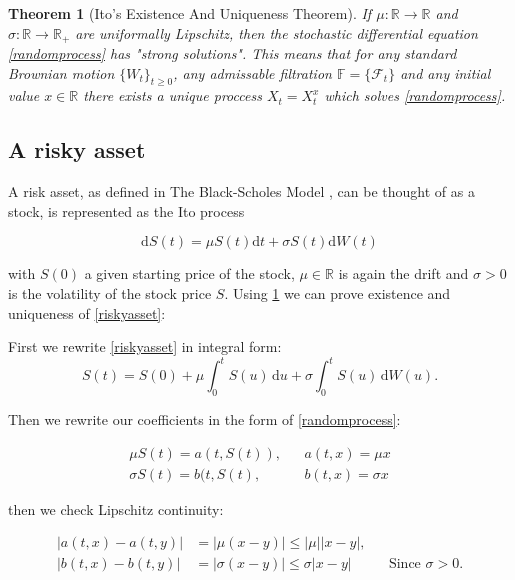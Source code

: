 \documentclass[11pt]{article} %
\newtheorem{theorem}{Theorem}[section]
\begin{document}
\begin{theorem}[Ito's Existence And Uniqueness Theorem] 
    \label{isosexistence}
    If $\mu : \mathbb{R} \to \mathbb{R}$ and $\sigma : \mathbb{R} \to \mathbb{R}_+$ 
    are uniformally Lipschitz, then the stochastic differential equation 
    \ref{randomprocess} has "strong solutions". This means that for any standard 
    Brownian motion $\{W_t\}_{t\geq0}$, any admissable filtration $\mathbb{F} = 
    \{\mathcal{F}_t\}$ and any initial value $x \in \mathbb{R}$ there exists a 
    unique proccess $X_t = X_t^x$ which solves \ref{randomprocess}.

    
\end{theorem}

\subsection{A risky asset}

A risk asset, as defined in The Black-Scholes Model \cite{blackscholes}, 
can be thought of as a stock, is represented as the Ito process

\begin{equation} \label{riskyasset}
    \mathrm{d}S(t) = \mu S(t)\mathrm{d}t + \sigma S(t) \mathrm{d}W(t)
\end{equation}

with $S(0)$ a given starting price of the stock, $\mu \in \mathbb{R}$ 
is again the drift and $\sigma > 0$ is the volatility of the stock 
price $S$. Using \ref{isosexistence} we can prove existence and uniqueness of 
\ref{riskyasset}:

First we rewrite \ref{riskyasset} in integral form:
\begin{equation}\label{riskyint}
    S(t) = S(0) + \mu\int_0^t \! S(u) \, \mathrm{d}u + \sigma\int_0^t \! S(u) \, 
    \mathrm{d}W(u).
\end{equation}

Then we rewrite our coefficients in the form of \ref{randomprocess}: 

\begin{align}
    \mu S(t) = a(t,S(t)), && a(t,x) = \mu x \\
    \sigma S(t) = b(t,S(t), && b(t,x) = \sigma x
\end{align}

then we check Lipschitz continuity:

\begin{align}
    |a(t,x) - a(t,y)| &= |\mu(x-y)| \leq |\mu||x-y|, \\
    |b(t,x) - b(t,y)| &= |\sigma(x-y)| \leq \sigma|x-y| &&\text{Since $\sigma > 0$.}
\end{align}
\end{document}
